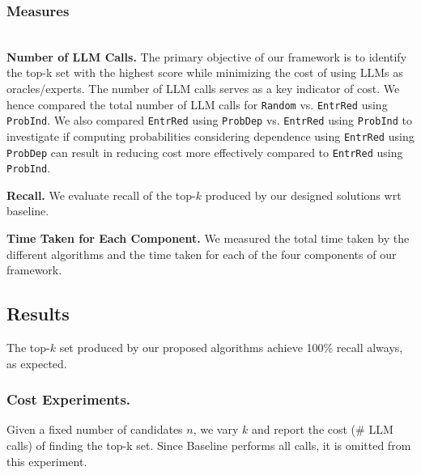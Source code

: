 \subsubsection{Measures}\label{sec:exp_measures}
\ \\ 
\noindent \textbf{Number of LLM Calls.} The primary objective of our framework is to identify the top-k set with the highest score while minimizing the cost of using LLMs as oracles/experts. The number of LLM calls serves as a key indicator of cost. %
We hence compared the total number of LLM calls for {\tt Random} vs. {\tt EntrRed} using {\tt ProbInd}. We also compared {\tt EntrRed} using {\tt ProbDep} vs. {\tt EntrRed} using {\tt ProbInd} to investigate if computing probabilities considering dependence using {\tt EntrRed} using {\tt ProbDep} can result in reducing cost more effectively compared to {\tt EntrRed} using {\tt ProbInd}. 

\noindent \textbf{Recall.} We evaluate recall of the top-$k$ produced by our designed solutions wrt baseline. 

\noindent \textbf{Time Taken for Each Component.} We measured the total time taken by the different algorithms and the time taken for each of the four components of our framework. 

\subsection{Results}\label{sec:results}
The top-$k$ set produced by our proposed algorithms achieve 100\% recall always, as expected.  
\subsubsection{\noindent \textbf{Cost Experiments.}}
Given a fixed number of candidates $n$, we vary \( k \) and report the cost (\# LLM calls) of finding the top-k set. Since Baseline performs all  calls, it is omitted from this experiment. 

